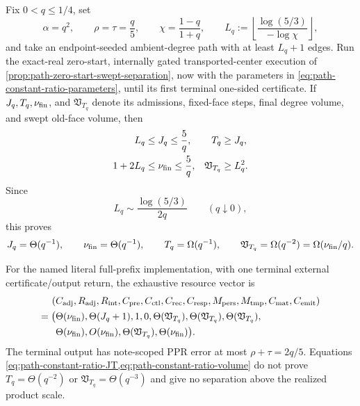\begin{proposition}
\label{prop:path-constant-ratio-floor}
Fix $0<q\leq1/4$, set
\begin{equation}
 \alpha=q^2,
 \qquad \rho=\tau=\frac q5,
 \qquad \chi=\frac{1-q}{1+q},
 \qquad
 L_q:=\left\lfloor
 \frac{\log(5/3)}{-\log\chi}
 \right\rfloor,
 \label{eq:path-constant-ratio-parameters}
\end{equation}
and take an endpoint-seeded ambient-degree path with at least $L_q+1$ edges.
Run the exact-real zero-start, internally gated transported-center execution
of \cref{prop:path-zero-start-swept-separation}, now with the parameters in
\cref{eq:path-constant-ratio-parameters}, until its first terminal one-sided
certificate.  If $J_q,T_q,\nu_{\rm fin}$, and $\mathfrak V_{T_q}$ denote its
admissions, fixed-face steps, final degree volume, and swept old-face volume,
then
\begin{align}
 L_q&\leq J_q\leq\frac5q,
 &T_q&\geq J_q,
 \label{eq:path-constant-ratio-JT}\\
 1+2L_q&\leq\nu_{\rm fin}\leq\frac5q,
 &\mathfrak V_{T_q}&\geq L_q^2.
 \label{eq:path-constant-ratio-volume}
\end{align}
Since
\begin{equation}
 L_q\sim\frac{\log(5/3)}{2q}
 \qquad(q\downarrow0),
 \label{eq:path-constant-ratio-radius}
\end{equation}
this proves
\begin{equation}
 J_q=\Theta(q^{-1}),
 \qquad \nu_{\rm fin}=\Theta(q^{-1}),
 \qquad T_q=\Omega(q^{-1}),
 \qquad
 \mathfrak V_{T_q}=\Omega(q^{-2})
 =\Omega(\nu_{\rm fin}/q).
 \label{eq:path-constant-ratio-floors}
\end{equation}

For the named literal full-prefix implementation, with one terminal external
certificate/output return, the exhaustive resource vector is
\begin{equation}
 \begin{aligned}
 (&C_{\rm adj},R_{\rm adj},R_{\rm int},C_{\rm pre},C_{\rm ctl},C_{\rm rec},
 C_{\rm resp},M_{\rm pers},M_{\rm tmp},C_{\rm mat},C_{\rm emit})\\
 =\bigl(&\Theta(\nu_{\rm fin}),\Theta(J_q+1),1,0,
 \Theta(\mathfrak V_{T_q}),\Theta(\mathfrak V_{T_q}),
 \Theta(\mathfrak V_{T_q}),\\
 &\Theta(\nu_{\rm fin}),O(\nu_{\rm fin}),
 \Theta(\mathfrak V_{T_q}),\Theta(\nu_{\rm fin})\bigr).
 \end{aligned}
 \label{eq:path-constant-ratio-eleven-vector}
\end{equation}
The terminal output has note-scoped PPR error at most
$\rho+\tau=2q/5$.  Equations
\cref{eq:path-constant-ratio-JT,eq:path-constant-ratio-volume} do not prove
$T_q=\Theta(q^{-2})$ or $\mathfrak V_{T_q}=\Theta(q^{-3})$ and give no
separation above the realized product scale.
\end{proposition}

